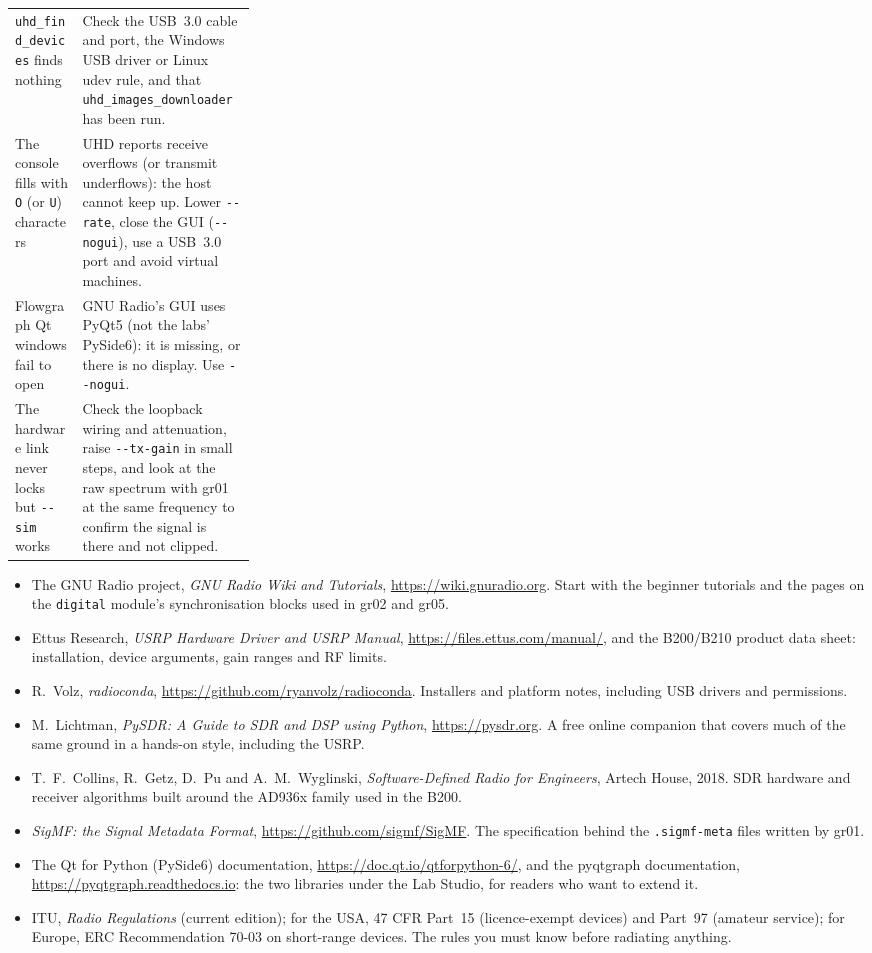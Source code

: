 \begin{table}[htbp]
\begin{tabularx}{\linewidth}{@{}>{\raggedright\arraybackslash}p{0.28\linewidth}>{\raggedright\arraybackslash}X@{}}
\texttt{uhd\_find\_devices} finds nothing & Check the USB~3.0 cable and port, the Windows USB driver or Linux udev rule, and that \texttt{uhd\_images\_downloader} has been run.\\
The console fills with \texttt{O} (or \texttt{U}) characters & UHD reports receive overflows (or transmit underflows): the host cannot keep up. Lower \texttt{-{}-rate}, close the GUI (\texttt{-{}-nogui}), use a USB~3.0 port and avoid virtual machines.\\
Flowgraph Qt windows fail to open & GNU Radio's GUI uses PyQt5 (not the labs' PySide6): it is missing, or there is no display. Use \texttt{-{}-nogui}.\\
The hardware link never locks but \texttt{-{}-sim} works & Check the loopback wiring and attenuation, raise \texttt{-{}-tx-gain} in small steps, and look at the raw spectrum with gr01 at the same frequency to confirm the signal is there and not clipped.\\
\bottomrule
\end{tabularx}
\end{table}

\FloatBarrier
\furtherreading
\begin{itemize}
\item The GNU Radio project, \emph{GNU Radio Wiki and Tutorials}, \url{https://wiki.gnuradio.org}. Start
with the beginner tutorials and the pages on the \texttt{digital} module's synchronisation blocks
used in gr02 and gr05.
\item Ettus Research, \emph{USRP Hardware Driver and USRP Manual}, \url{https://files.ettus.com/manual/},
and the B200/B210 product data sheet: installation, device arguments, gain ranges and RF limits.
\item R.~Volz, \emph{radioconda}, \url{https://github.com/ryanvolz/radioconda}. Installers and
platform notes, including USB drivers and permissions.
\item M.~Lichtman, \emph{PySDR: A Guide to SDR and DSP using Python}, \url{https://pysdr.org}. A free
online companion that covers much of the same ground in a hands-on style, including the USRP.
\item T.~F.~Collins, R.~Getz, D.~Pu and A.~M.~Wyglinski, \emph{Software-Defined Radio for Engineers},
Artech House, 2018. SDR hardware and receiver algorithms built around the AD936x family used in the
B200.
\item \emph{SigMF: the Signal Metadata Format}, \url{https://github.com/sigmf/SigMF}. The specification
behind the \texttt{.sigmf-meta} files written by gr01.
\item The Qt for Python (PySide6) documentation, \url{https://doc.qt.io/qtforpython-6/}, and the
pyqtgraph documentation, \url{https://pyqtgraph.readthedocs.io}: the two libraries under the Lab
Studio, for readers who want to extend it.
\item ITU, \emph{Radio Regulations} (current edition); for the USA, 47 CFR Part~15 (licence-exempt
devices) and Part~97 (amateur service); for Europe, ERC Recommendation 70-03 on short-range devices.
The rules you must know before radiating anything.
\end{itemize}
